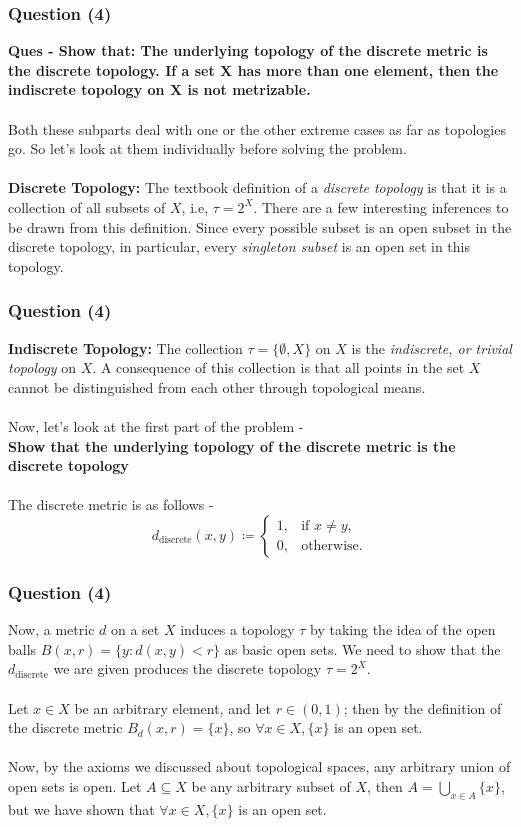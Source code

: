 
\begin{frame}
    \frametitle{Question (4)}
    \textbf{Ques - Show that: The underlying topology of the discrete metric is the discrete topology. If a set X has more than one element, then the indiscrete topology on X is not metrizable.}\\\\
    Both these subparts deal with one or the other extreme cases as far as topologies go. So let's look at them individually before solving the problem.\\\\
    \textbf{Discrete Topology:} The textbook definition of a \textit{discrete topology} is that it is a collection of all subsets of $X$, i.e, $\tau = 2^{X}$. There are a few interesting inferences to be drawn from this definition. Since every possible subset is an open subset in the discrete topology, in particular, every \textit{singleton subset} is an open set in this topology.
\end{frame}

\begin{frame}
    \frametitle{Question (4)}
    \textbf{Indiscrete Topology:} The collection $\tau = \{ \emptyset , X \}$ on $X$ is the \textit{indiscrete, or trivial topology} on $X$. A consequence of this collection is that all points in the set $X$ cannot be distinguished from each other through topological means.\\\\
    Now, let's look at the first part of the problem - \\
    \textbf{Show that the underlying topology of the discrete metric is the discrete topology} \\\\
    The discrete metric is as follows - \\
    \[
        d_{\text{discrete}}(x,y) \coloneqq 
        \begin{cases}
            1, & \text{if } x \neq y, \\
            0, & \text{otherwise}.
        \end{cases}
    \]
\end{frame}

\begin{frame}
    \frametitle{Question (4)}
    Now, a metric $d$ on a set $X$ induces a topology $\tau$ by taking the idea of the open balls $B(x,r) = \{y : d(x,y) < r\}$ as basic open sets. We need to show that the $d_{\text{discrete}}$ we are given produces the discrete topology $\tau = 2^{X}$.\\\\
    Let $x \in X$ be an arbitrary element, and let $r \in (0, 1)$; then by the definition of the discrete metric $B_d(x,r) = \{x\}$, so $\forall x \in X, \{x\}$ is an open set.\\\\
    Now, by the axioms we discussed about topological spaces, any arbitrary union of open sets is open. Let $A \subseteq X$ be any arbitrary subset of $X$, then $A = \bigcup_{x \in A} \{x\}$, but we have shown that $\forall x \in X, \{x\}$ is an open set.
\end{frame}

